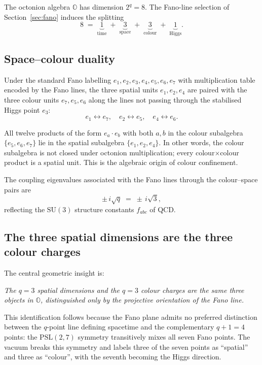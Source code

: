The octonion algebra $\mathbb{O}$ has dimension $2^q=8$.  The Fano-line
selection of Section~\ref{sec:fano} induces the splitting
\begin{equation}
  \label{eq:O_split}
  8 \;=\; \underbrace{1}_{\text{time}}
       \;+\; \underbrace{3}_{\text{space}}
       \;+\; \underbrace{3}_{\text{colour}}
       \;+\; \underbrace{1}_{\text{Higgs}}.
\end{equation}

\subsection{Space--colour duality}

Under the standard Fano labelling
$e_1,e_2,e_3,e_4,e_5,e_6,e_7$ with multiplication table encoded by the
Fano lines, the three spatial units $e_1,e_2,e_4$ are paired with the
three colour units $e_7,e_5,e_6$ along the lines not passing through the
stabilised Higgs point $e_3$:
\begin{equation}
  \label{eq:space_color_duality}
  e_1 \leftrightarrow e_7, \quad e_2 \leftrightarrow e_5, \quad
  e_4 \leftrightarrow e_6.
\end{equation}

\begin{proposition}
All twelve products of the form $e_a \cdot e_b$ with both $a,b$ in the
colour subalgebra $\{e_5,e_6,e_7\}$ lie in the spatial subalgebra
$\{e_1,e_2,e_4\}$.  In other words, the colour subalgebra is not closed
under octonion multiplication; every colour$\times$colour product is a
spatial unit.  This is the algebraic origin of colour confinement.
\end{proposition}

The coupling eigenvalues associated with the Fano lines through the
colour--space pairs are
\begin{equation}
  \label{eq:coupling_eigenvalues}
  \pm\,i\sqrt{q} \;=\; \pm\,i\sqrt{3},
\end{equation}
reflecting the $\mathrm{SU}(3)$ structure constants $f_{abc}$ of QCD.

\subsection{The three spatial dimensions are the three colour charges}

The central geometric insight is:
\begin{center}
\textit{The $q=3$ spatial dimensions and the $q=3$ colour charges
are \emph{the same} three objects in $\mathbb{O}$, distinguished only
by the projective orientation of the Fano line.}
\end{center}
This identification follows because the Fano plane admits no preferred
distinction between the $q$-point line defining spacetime and the
complementary $q+1=4$ points: the $\mathrm{PSL}(2,7)$ symmetry
transitively mixes all seven Fano points.  The vacuum breaks this symmetry
and labels three of the seven points as ``spatial'' and three as
``colour'', with the seventh becoming the Higgs direction.

